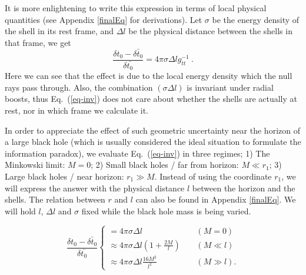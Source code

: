 \documentclass[aps,showpacs,onecolumn,floats,prd,superscriptaddress,nofootinbib]{revtex4-1}
\begin{document}
It is more enlightening to write this expression in terms of local physical quantities (see Appendix \ref{finalEq} for derivations).  Let $\sigma$ be the energy density of the shell in its rest frame, and $\Delta l$ be the physical distance between the shells in that frame, we get
\begin{equation}
	\frac{\delta t_0 - \bar{ \delta t_0}}{\delta \bar{t_0}} = 4 \pi \sigma \Delta l g_{tt}^{-1}~.
	\label{eq-inv}
\end{equation}
Here we can see that the effect is due to the local energy density which the null rays pass through.
Also, the combination $(\sigma\Delta l)$ is invariant under radial boosts, thus Eq.~(\ref{eq-inv}) does not care about whether the shells are actually at rest, nor in which frame we calculate it.

In order to appreciate the effect of such geometric uncertainty near the horizon of a large black hole (which is usually considered the ideal situation to formulate the information paradox), we evaluate Eq.~(\ref{eq-inv}) in three regimes; 
1) The Minkowski limit: $M=0$; 
2) Small black holes / far from horizon: $M \ll r_1$; 
3) Large black holes / near horizon: $r_1\gg M$. 
Instead of using the coordinate $r_1$, we will express the answer with the physical distance $l$ between the horizon and the shells. 
The relation between $r$ and $l$ can also be found in Appendix \ref{finalEq}. 
We will hold $l$, $\Delta l$ and $\sigma$ fixed while the black hole mass is being varied.

\begin{equation}
\frac{\delta t_0 - \bar{ \delta t_0}}{\delta \bar{t_0}}  \begin{cases}
= 4 \pi \sigma \Delta l~	 &\ \ \ \ \ (M = 0)\\
\approx 4\pi \sigma \Delta l \left( 1 + \frac{2M}{l} \right) & \ \ \ \ \ (M \ll l)	\\
\approx 4 \pi  \sigma \Delta l \frac{16M^2}{l^2} & \ \ \ \ \ (M \gg l).
\end{cases}	\label{fin-result}
\end{equation}
\end{document}

